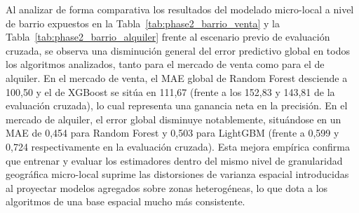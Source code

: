 \documentclass[a4paper,11pt,openany]{book}
\begin{document}
\begin{table}[H]
\centering
\caption{Matriz de rendimiento comparativa: Alineación de escalas a nivel micro-local de barrio con retardos temporales - Mercado de Alquiler (€/m\textsuperscript{2})}
\label{tab:phase2_barrio_alquiler}
\end{table}

Al analizar de forma comparativa los resultados del modelado micro-local a nivel de barrio expuestos en la Tabla~\ref{tab:phase2_barrio_venta} y la Tabla~\ref{tab:phase2_barrio_alquiler} frente al escenario previo de evaluación cruzada, se observa una disminución general del error predictivo global en todos los algoritmos analizados, tanto para el mercado de venta como para el de alquiler. En el mercado de venta, el MAE global de Random Forest desciende a 100,50  y el de XGBoost se sitúa en 111,67  (frente a los 152,83 y 143,81  de la evaluación cruzada), lo cual representa una ganancia neta en la precisión. En el mercado de alquiler, el error global disminuye notablemente, situándose en un MAE de 0,454  para Random Forest y 0,503  para LightGBM (frente a 0,599 y 0,724  respectivamente en la evaluación cruzada). Esta mejora empírica confirma que entrenar y evaluar los estimadores dentro del mismo nivel de granularidad geográfica micro-local suprime las distorsiones de varianza espacial introducidas al proyectar modelos agregados sobre zonas heterogéneas, lo que dota a los algoritmos de una base espacial mucho más consistente.
\end{document}
